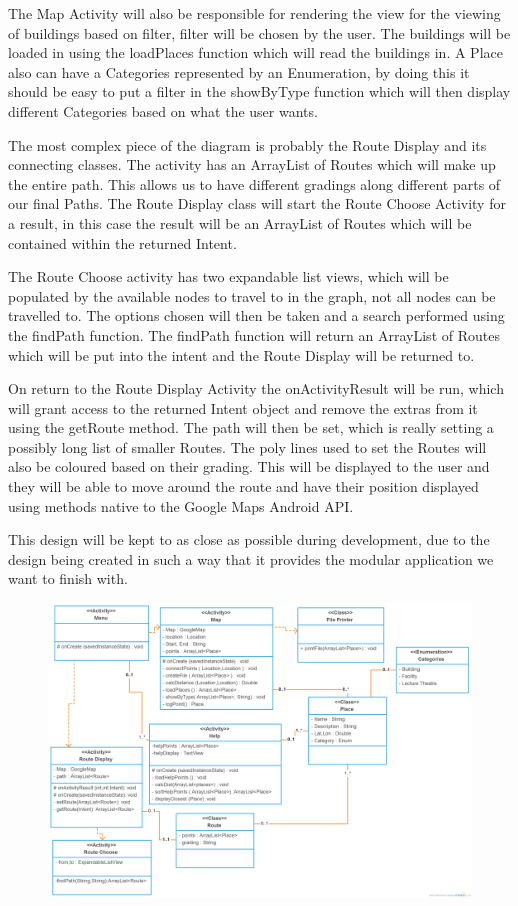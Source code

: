 The Map Activity will also be responsible for rendering the view for the viewing of buildings based on filter, filter will be chosen by the user. The buildings will be loaded in using the loadPlaces function which will read the buildings in. A Place also can have a Categories represented by an Enumeration, by doing this it should be easy to put a filter in the showByType function which will then display different Categories based on what the user wants. 

The most complex piece of the diagram is probably the Route Display and its connecting classes. The activity has an ArrayList of Routes which will make up the entire path. This allows us to have different gradings along different parts of our final Paths. The Route Display class will start the Route Choose Activity for a result, in this case the result will be an ArrayList of Routes which will be contained within the returned Intent. 

The Route Choose activity has two expandable list views, which will be populated by the available nodes to travel to in the graph, not all nodes can be travelled to. The options chosen will then be taken and a search performed using the findPath function. The findPath function will return an ArrayList of Routes which will be put into the intent and the Route Display will be returned to.

On return to the Route Display Activity the onActivityResult will be run, which will grant access to the returned Intent object and remove the extras from it using the getRoute method. The path will then be set, which is really setting a possibly long list of smaller Routes. The poly lines used to set the Routes will also be coloured based on their grading. This will be displayed to the user and they will be able to move around the route and have their position displayed using methods native to the Google Maps Android API. 

This design will be kept to as close as possible during development, due to the design being created in such a way that it provides the modular application we want to finish with. 
\begin{figure}
\includegraphics[scale=0.29]{Design/Class.png}
\end{figure}
\newpage
